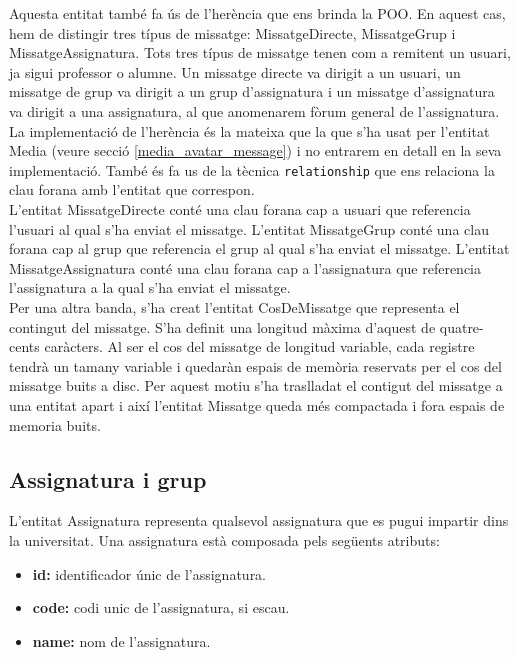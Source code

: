      Aquesta entitat també fa ús de l'herència que ens brinda la \ac{POO}. En aquest cas, hem de distingir tres típus de missatge: MissatgeDirecte, MissatgeGrup i MissatgeAssignatura. Tots tres típus de missatge tenen com a remitent un usuari, ja sigui professor o alumne. Un missatge directe va dirigit a un usuari, un missatge de grup va dirigit a un grup d'assignatura i un missatge d'assignatura va dirigit a una assignatura, al que anomenarem fòrum general de l'assignatura. \\
    
   	La implementació de l'herència és la mateixa que la que s'ha usat per l'entitat Media (veure secció \ref{media_avatar_message}) i no entrarem en detall en la seva implementació. També és fa us de la tècnica \texttt{relationship} que ens relaciona la clau forana amb l'entitat que correspon. \\
   	
   	L'entitat MissatgeDirecte conté una clau forana cap a usuari que referencia l'usuari al qual s'ha enviat el missatge. L'entitat MissatgeGrup conté una clau forana cap al grup que referencia el grup al qual s'ha enviat el missatge. L'entitat MissatgeAssignatura conté una clau forana cap a l'assignatura que referencia l'assignatura a la qual s'ha enviat el missatge.\\
   	
   	Per una altra banda, s'ha creat l'entitat CosDeMissatge que representa el contingut del missatge. S'ha definit una longitud màxima d'aquest de quatre-cents caràcters. Al ser el cos del missatge de longitud variable, cada registre tendrà un tamany variable i quedaràn espais de memòria reservats per el cos del missatge buits a disc. Per aquest motiu s'ha traslladat el contigut del missatge a una entitat apart i així l'entitat Missatge queda més compactada i fora espais de memoria buits.\\
   	
   	\subsection{Assignatura i grup}
   	
   	L'entitat Assignatura representa qualsevol assignatura que es pugui impartir dins la universitat. Una assignatura està composada pels següents atributs:
   	
   	\begin{itemize}
   		\item \textbf{id:} identificador únic de l'assignatura.
   		\item \textbf{code:} codi unic de l'assignatura, si escau.
   		\item \textbf{name:} nom de l'assignatura.
   	\end{itemize}
   	
